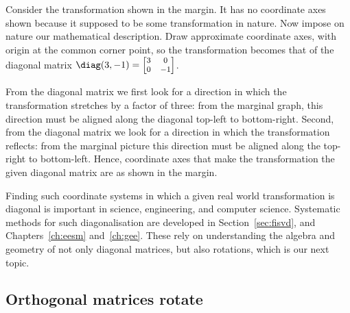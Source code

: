\begin{example} \label{eg:}
Consider the transformation shown in the margin.
%
It has no coordinate axes shown because it supposed to be some transformation in nature. 
Now impose on nature our mathematical description.
Draw approximate coordinate axes, with origin at the common corner point, so the transformation becomes that of the diagonal matrix \(\diag(3,-1)=\footnotesize\begin{bmatrix} 3&0\\0&-1 \end{bmatrix}\).

\begin{solution} 
From the diagonal matrix we first look for a direction in which the transformation stretches by a factor of three: 
%
from the marginal graph, this direction must be aligned along the diagonal top-left to bottom-right.
Second, from the diagonal matrix we look for a direction in which the transformation reflects: from the marginal picture this direction must be aligned along the top-right to bottom-left.
Hence, coordinate axes that make the transformation the given diagonal matrix are as shown in the margin. 
\end{solution}
\end{example}


Finding such coordinate systems in which a given real world transformation is diagonal is important in science, engineering, and computer science.
Systematic methods for such diagonalisation are developed in Section~\ref{sec:fisvd}, and Chapters~\ref{ch:eesm} and~\ref{ch:gee}.
These rely on understanding the algebra and geometry of not only diagonal matrices, but also rotations, which is our next topic.













\subsection{Orthogonal matrices rotate}
\label{sec:omr}


